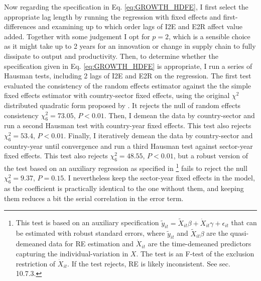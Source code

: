 \documentclass[a4paper]{article}
\begin{document}
Now regarding the specification in Eq. \ref{eq:GROWTH_HDFE}, I first select the appropriate lag length by running the regression with fixed effects and first-differences and examining up to which order lags of I2E and E2R affect value added. Together with some judgement I opt for $p = 2$, which is a sensible choice as it might take up to 2 years for an innovation or change in supply chain to fully dissipate to output and productivity. Then, to determine whether the specification given in Eq. \ref{eq:GROWTH_HDFE} is appropriate, I run a series of Hausman tests, including 2 lags of I2E and E2R on the regression. The first test evaluated the consistency of the random effects estimator against the the  simple fixed effects estimator with country-sector fixed effects, using the original $\chi^2$ distributed quadratic form proposed by \citet{hausman1978specification}. It rejects the null of random effects consistency $\chi^2_6 = 73.05$, $P < 0.01$. Then, I demean the data by country-sector and run a second Hausman test with country-year fixed effects. This test also rejects $\chi^2_6 = 53.4$, $P < 0.01$. Finally, I iteratively demean the data by country-sector and country-year until convergence and run a third Hausman test against sector-year fixed effects. This test also rejects $\chi^2_6 = 48.55$, $P < 0.01$, but a robust version of the test based on an auxiliary regression as specified in \citet{wooldridge2010econometric}\footnote{This test is based on an auxiliary specification $\tilde{y}_{it} = \tilde{X}_{it}\beta + \dot{X}_{it}\gamma + \epsilon_{it}$ that can be estimated with robust standard errors, where  $\tilde{y}_{it} $ and $\tilde{X}_{it}\beta$ are the quasi-demeaned data for RE estimation and $\dot{X}_{it}$ are the time-demeaned predictors capturing the individual-variation in $X$. The test is an F-test of the exclusion restriction of $\dot{X}_{it}$. If the test rejects, RE is likely inconsistent. See \citet{wooldridge2010econometric} sec. 10.7.3.} fails to reject the null $\chi^2_6 = 9.37$, $P = 0.15$. I nevertheless keep the sector-year fixed effects in the model, as the coefficient is practically identical to the one without them, and keeping them reduces a bit the serial correlation in the error term. \newline
\end{document}
